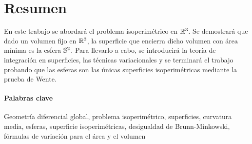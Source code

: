 \section{Resumen}

En este trabajo se abordará el problema isoperimétrico en $\mathbb{R}^3$. Se demostrará que dado un volumen fijo en $\mathbb{R}^3$, la superficie que encierra dicho volumen con área mínima es la esfera $\mathbb{S}^2$. Para llevarlo a cabo, se introducirá la teoría de integración en superficies, las técnicas variacionales y se terminará el trabajo probando que las esferas son las únicas superficies isoperimétricas mediante la prueba de Wente.

\paragraph{Palabras clave} Geometría diferencial global, problema isoperimétrico, superficies, curvatura media, esferas, superficie isoperimétricas, desigualdad de Brunn-Minkowski, fórmulas de variación para el área y el volumen

\newpage
